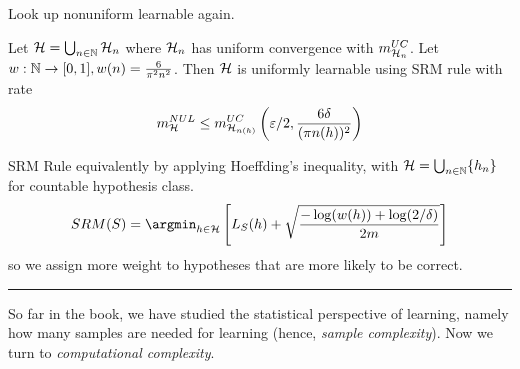 \documentclass[a4paper, 10pt]{article}
\begin{document}
    \begin{remark}
    Look up nonuniform learnable again.
    \end{remark}

    \begin{theorem}
        Let $\mathcal{H} = \bigcup_{n \in \mathbb{N}} \mathcal{H}_n$ where $\mathcal{H}_n$ has uniform convergence with $m_{\mathcal{H}_n}^{UC}$. Let $w: \mathbb{N} \to [0, 1], w(n) = \frac{6}{\pi^2n^2}$. Then $\mathcal{H}$ is uniformly learnable using SRM rule with rate \begin{equation*}
        m_{\mathcal{H}}^{NUL} \leq m^{UC}_{\mathcal{H}_{n(h)}}\left(\varepsilon/2, \dfrac{6\delta}{(\pi n(h))^2}\right)
        \end{equation*}
    \end{theorem}

    SRM Rule equivalently by applying Hoeffding's inequality, with $\mathcal{H} = \bigcup_{n \in \mathbb{N}}\{h_n\}$ for countable hypothesis class.
    \begin{equation*}
    SRM(S) = \argmin_{h \in \calh} \left[L_S(h) + \sqrt{\dfrac{-\log(w(h)) + \log(2/\delta)}{2m}}\right]
    \end{equation*}
    so we assign more weight to hypotheses that are more likely to be correct.

    \hrule
    So far in the book, we have studied the statistical perspective of learning, namely how many samples are needed for learning (hence, \textit{sample complexity}). Now we turn to \textit{computational complexity}.
\end{document}
